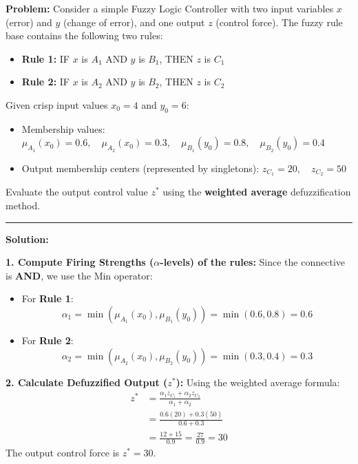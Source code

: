 \documentclass[12pt,a4paper]{article}
\begin{document}
\begin{tcolorbox}[examplebox, title={Fuzzy Inference System Evaluation}]
\textbf{Problem:} Consider a simple Fuzzy Logic Controller with two input variables $x$ (error) and $y$ (change of error), and one output $z$ (control force).
The fuzzy rule base contains the following two rules:
\begin{itemize}[leftmargin=*, itemsep=2pt]
  \item \textbf{Rule 1:} IF $x$ is $A_1$ AND $y$ is $B_1$, THEN $z$ is $C_1$
  \item \textbf{Rule 2:} IF $x$ is $A_2$ AND $y$ is $B_2$, THEN $z$ is $C_2$
\end{itemize}

Given crisp input values $x_0 = 4$ and $y_0 = 6$:
\begin{itemize}[leftmargin=*, itemsep=2pt]
  \item Membership values: $\mu_{A_1}(x_0) = 0.6, \quad \mu_{A_2}(x_0) = 0.3, \quad \mu_{B_1}(y_0) = 0.8, \quad \mu_{B_2}(y_0) = 0.4$
  \item Output membership centers (represented by singletons): $z_{C_1} = 20, \quad z_{C_2} = 50$
\end{itemize}
Evaluate the output control value $z^*$ using the \textbf{weighted average} defuzzification method.
\par\vspace{4pt}\noindent\rule{\linewidth}{0.5pt}\par
\textbf{Solution:}

\textbf{1. Compute Firing Strengths ($\alpha$-levels) of the rules:}
Since the connective is \textbf{AND}, we use the Min operator:
\begin{itemize}[leftmargin=*, itemsep=2.5pt]
  \item For \textbf{Rule 1}:
    \begin{equation*}
      \alpha_1 = \min\left( \mu_{A_1}(x_0), \mu_{B_1}(y_0) \right) = \min(0.6, 0.8) = 0.6
    \end{equation*}
  \item For \textbf{Rule 2}:
    \begin{equation*}
      \alpha_2 = \min\left( \mu_{A_2}(x_0), \mu_{B_2}(y_0) \right) = \min(0.3, 0.4) = 0.3
    \end{equation*}
\end{itemize}

\par\vspace{4pt}
\textbf{2. Calculate Defuzzified Output ($z^*$):}
Using the weighted average formula:
\begin{align*}
  z^* &= \frac{\alpha_1 z_{C_1} + \alpha_2 z_{C_2}}{\alpha_1 + \alpha_2} \\
  &= \frac{0.6(20) + 0.3(50)}{0.6 + 0.3} \\
  &= \frac{12 + 15}{0.9} = \frac{27}{0.9} = 30
\end{align*}
The output control force is $z^* = 30$.
\end{tcolorbox}
\end{document}
